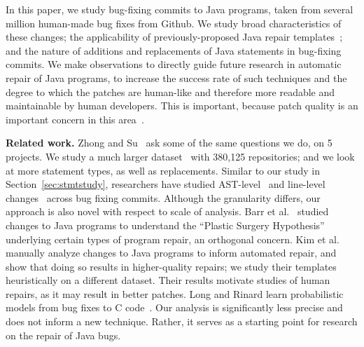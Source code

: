\documentclass{sig-alternate-05-2015}
\begin{document}
In this paper, we study bug-fixing commits to Java programs, 
taken from several million human-made bug fixes from Github. We study broad
characteristics of these changes; the applicability of previously-proposed
Java repair templates~\cite{kim2013}; and the nature
of additions and replacements of Java statements in bug-fixing commits. We make
observations to directly guide future research in automatic repair of Java
programs, to increase the success rate of such techniques and the degree to
which the patches are human-like and therefore more readable and maintainable by
human developers. This is important, because patch quality is an important
concern in this area~\cite{Qi15}.


\vspace{1ex} \noindent\textbf{Related work.} Zhong and Su~\cite{zhong2015} ask
some of the same questions we do, on  5 projects. We study a much
larger dataset~\cite{dyer2013} with 380,125 repositories; and we look at more
statement types, as well as replacements. Similar to our study in
Section~\ref{sec:stmtstudy}, researchers have 
studied AST-level~\cite{Martinez:2015ez} and line-level
changes~\cite{Asaduzzaman:2013df} across bug fixing commits.
Although the granularity differs, our approach is also novel with respect to scale of
analysis. Barr et al.~\cite{Barr14fse} studied changes to Java programs to
understand the ``Plastic Surgery Hypothesis'' underlying certain types of
program repair, an orthogonal concern. Kim et al.~\cite{kim2013} manually
analyze changes to Java programs to inform automated repair, and
show that doing so results in higher-quality repairs; we study their templates
heuristically on a different dataset. Their results motivate studies of human
repairs, as it may result in better patches.  Long and Rinard learn
probabilistic models from bug fixes to C code~\cite{Long2016}. Our analysis is
significantly less precise and does not inform a new technique.  Rather, it
serves as a starting point for research on the repair of Java bugs.
\end{document}
